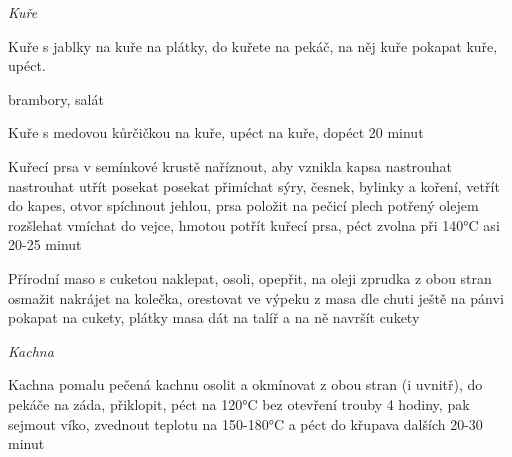 \documentclass[12pt,a4paper]{article}
\renewcommand{\sidedish}[1]{\item {#1}}
\begin{document}
\vspace*{\fill}
\hfill {\Huge\it Kuře}\hfill
\vspace*{\fill}
\newpage

\begin{recipe}{Kuře s jablky}
   na kuře
   na plátky, do kuřete
   na pekáč, na něj kuře
   pokapat kuře, upéct.
  \sidedish{brambory, salát} 
\end{recipe}
\newpage

\begin{recipe}{Kuře s medovou kůrčičkou}
   na kuře, upéct
   na kuře, dopéct 20 minut
\end{recipe}
\newpage

\begin{recipe}{Kuřecí prsa v semínkové krustě}
   naříznout, aby vznikla kapsa
   nastrouhat
   nastrouhat
   utřít
   posekat
   posekat
   přimíchat sýry, česnek, bylinky a koření, vetřít do kapes, otvor spíchnout jehlou, prsa položit na pečicí plech potřený olejem
   rozšlehat
   vmíchat do vejce, hmotou potřít kuřecí prsa, péct zvolna při 140°C asi 20-25 minut
\end{recipe}
\newpage

\begin{recipe}{Přírodní maso s cuketou}
   naklepat, osoli, opepřit, na oleji zprudka z obou stran osmažit
   nakrájet na kolečka, orestovat ve výpeku z masa
   dle chuti ještě na pánvi pokapat na cukety, plátky masa dát na talíř a na ně navršít cukety
\end{recipe}
\newpage

\vspace*{\fill}
\hfill {\Huge\it Kachna}\hfill
\vspace*{\fill}
\newpage

\begin{recipe}{Kachna pomalu pečená}
   kachnu osolit a okmínovat z obou stran (i uvnitř), do pekáče na záda, přiklopit, péct na 120°C bez otevření trouby 4 hodiny, pak sejmout víko, zvednout teplotu na 150-180°C a péct do křupava dalších 20-30 minut 
\end{recipe}
\newpage
\end{document}
